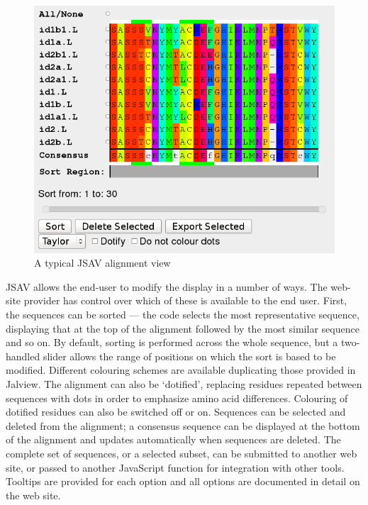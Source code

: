 \documentclass[10pt,a4paper,twocolumn]{article}
\begin{document}
\begin{figure}
\centering
\includegraphics[width=\columnwidth]{demo.png}
\caption{\label{fig:demo}A typical JSAV alignment view}
\end{figure}

JSAV allows the end-user to modify the display in a number of ways.
The web-site provider has control over which of these is available to
the end user. First, the sequences can be sorted --- the code selects
the most representative sequence, displaying that at the top of the
alignment followed by the most similar sequence and so on. By default,
sorting is performed across the whole sequence, but a two-handled
slider allows the range of positions on which the sort is based to be
modified. Different colouring schemes are available duplicating those
provided in Jalview. The alignment can also be `dotified', replacing
residues repeated between sequences with dots in order to emphasize
amino acid differences. Colouring of dotified residues can also be
switched off or on. Sequences can be selected and deleted from the
alignment; a consensus sequence can be displayed at the bottom of the
alignment and updates automatically when sequences are deleted. The
complete set of sequences, or a selected subset, can be submitted to
another web site, or passed to another JavaScript function for
integration with other tools. Tooltips are provided for each option
and all options are documented in detail on the web site.
\end{document}
